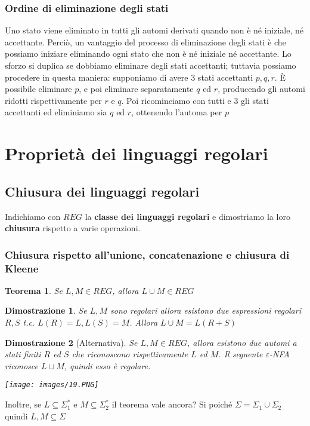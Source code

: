 \documentclass[12pt]{article}
\newtheorem{Teorema}{Teorema}[subsection]
\newtheorem{Dimostrazione}{Dimostrazione}[subsection]
\begin{document}
\subsubsection{Ordine di eliminazione degli stati}
Uno stato viene eliminato in tutti gli automi derivati quando non è né iniziale, né accettante. Perciò, un vantaggio del processo di eliminazione degli stati è che possiamo iniziare eliminando ogni stato che non è né iniziale né accettante. Lo sforzo si duplica se dobbiamo eliminare degli stati accettanti; tuttavia possiamo procedere in questa maniera: supponiamo di avere 3 stati accettanti $p, q, r$. È possibile eliminare $p$, e poi eliminare separatamente $q$ ed $r$, producendo gli automi ridotti rispettivamente per $r$ e $q$. Poi ricominciamo con tutti e 3 gli stati accettanti ed eliminiamo sia $q$ ed $r$, ottenendo l'automa per $p$

\section{Proprietà dei linguaggi regolari}
\subsection{Chiusura dei linguaggi regolari}
Indichiamo con $REG$ la \textbf{classe dei linguaggi regolari} e dimostriamo la loro \textbf{chiusura} rispetto a varie operazioni.
\subsubsection{Chiusura rispetto all'unione, concatenazione e chiusura di Kleene}
\begin{Teorema}
Se $L, M \in REG$, allora $L \cup M \in REG$    
\end{Teorema}

\begin{Dimostrazione}
    Se $L, M$ sono regolari allora esistono due espressioni regolari $R, S$ t.c.
    $L(R) = L, L(S) = M$. Allora $L\cup M = L(R+S)$
\end{Dimostrazione}

\begin{Dimostrazione}[Alternativa]
    Se $L, M \in REG$, allora esistono due automi a stati finiti $R$ ed $S$ che riconoscono rispettivamente $L$ ed $M$. Il seguente $\varepsilon$-NFA riconosce $L\cup M$, quindi esso è regolare.
    \begin{center}
        \texttt{[image: images/19.PNG]}
    \end{center}
\end{Dimostrazione}
Inoltre, se $L \subseteq \Sigma^*_1$ e $M \subseteq \Sigma^*_2$ il teorema vale ancora? Si poiché $\Sigma = \Sigma_1 \cup \Sigma_2$ quindi $L, M \subseteq \Sigma$
\end{document}

